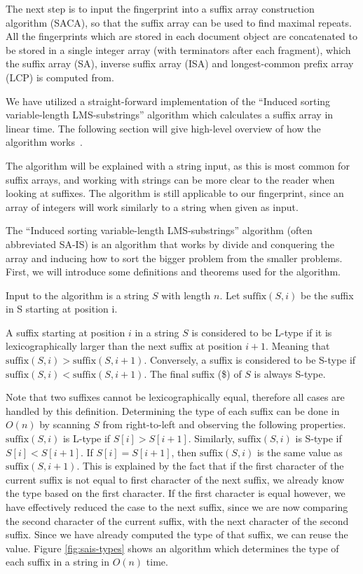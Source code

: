The next step is to input the fingerprint into a suffix array construction algorithm
(SACA), so that the suffix array can be used to find maximal repeats. All the fingerprints
which are stored in each document object are concatenated to be stored in a single integer
array (with terminators after each fragment), which the suffix array (SA), inverse suffix
array (ISA) and longest-common prefix array (LCP) is computed from.

We have utilized a straight-forward implementation of the ``Induced sorting
variable-length LMS-substrings'' algorithm which calculates a suffix array in linear time.
The following section will give high-level overview of how the algorithm
works~\cite{LinearTimeSuffixArraySAIS}. 

The algorithm will be explained with a string input, as this is most common for suffix
arrays, and working with strings can be more clear to the reader when looking at suffixes.
The algorithm is still applicable to our fingerprint, since an array of integers will work
similarly to a string when given as input.

The ``Induced sorting variable-length LMS-substrings'' algorithm (often abbreviated SA-IS)
is an algorithm that works by divide and conquering the array and inducing how to sort the
bigger problem from the smaller problems. First, we will introduce some definitions and
theorems used for the algorithm.

Input to the algorithm is a string $S$ with length $n$. Let $\text{suffix}(S, i)$ be the
suffix in S starting at position i.

\begin{definition} A suffix starting at position $i$ in a
    string $S$ is considered to be L-type if it is lexicographically larger than the next
    suffix at position $i + 1$. Meaning that $\text{suffix}(S, i) > \text{suffix}(S,
    i+1)$. Conversely, a suffix is considered to be S-type if $\text{suffix}(S, i) <
    \text{suffix}(S, i+1)$. The final suffix (\$) of $S$ is always S-type.
\end{definition}

Note that two suffixes cannot be lexicographically equal, therefore all cases are handled
by this definition. Determining the type of each suffix can be done in $O(n)$ by scanning
$S$ from right-to-left and observing the following properties. $\text{suffix}(S, i)$ is
L-type if $S[i] > S[i + 1]$. Similarly, $\text{suffix}(S, i)$ is S-type if $S[i] < S[i +
1]$. If $S[i] = S[i + 1]$, then $\text{suffix}(S, i)$ is the same value as
$\text{suffix}(S, i + 1)$. This is explained by the fact that if the first character of
the current suffix is not equal to first character of the next suffix, we already know the
type based on the first character. If the first character is equal however, we have
effectively reduced the case to the next suffix, since we are now comparing the second
character of the current suffix, with the next character of the second suffix. Since we
have already computed the type of that suffix, we can reuse the value. Figure
\ref{fig:sais-types} shows an algorithm which determines the type of each suffix in a
string in $O(n)$ time.

